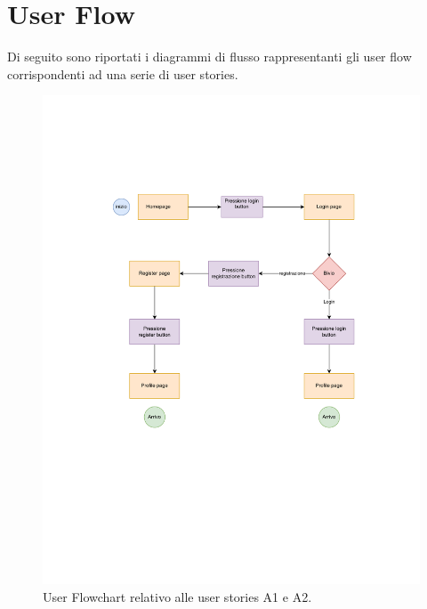 \documentclass[9pt]{extarticle}
\begin{document}
\newpage
\section{User Flow}

Di seguito sono riportati i diagrammi di flusso rappresentanti gli user flow corrispondenti ad una serie di user stories.

\begin{figure}[!htb]
	\centering
	\includegraphics[width=\linewidth]{./images/A1-A2.drawio.pdf}
	\caption{User Flowchart relativo alle user stories A1 e A2.}
	\label{fig:A1-A2}
\end{figure}

	
\end{document}

